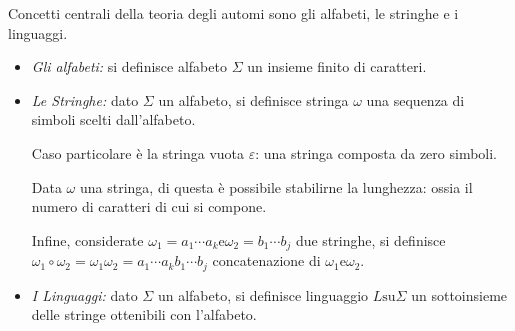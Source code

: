 \documentclass{subfiles}
\begin{document}
Concetti  centrali della teoria degli automi sono gli alfabeti, le stringhe e i linguaggi.
\begin{itemize}
    \item \emph{Gli alfabeti:}
          si definisce alfabeto \(\Sigma\) un insieme finito di caratteri.

    \item \emph{Le Stringhe:}
          dato \(\Sigma\) un alfabeto, si definisce stringa \(\omega\) una sequenza di simboli scelti dall'alfabeto.

          Caso particolare è la stringa vuota \(\varepsilon\): una stringa composta da zero simboli.


          Data \(\omega\) una stringa, di questa è possibile stabilirne la lunghezza: ossia il numero di caratteri di cui si compone.

          Infine, considerate \(\omega_{1} = a_{1} \cdots a_{k} \text{e} \omega_{2} = b_{1} \cdots b_{j}\) due stringhe,
          si definisce \(\omega_{1} \circ \omega_{2} = \omega_{1}\omega_{2}=  a_{1} \cdots a_{k} b_{1} \cdots b_{j}\) concatenazione di \(\omega_{1} \text{e} \omega_{2}\).

    \item \emph{I Linguaggi:} dato \(\Sigma\) un alfabeto, si definisce linguaggio \(L \text{su} \Sigma\) un sottoinsieme delle stringe ottenibili con l'alfabeto.
\end{itemize}
\clearpage
\end{document}
